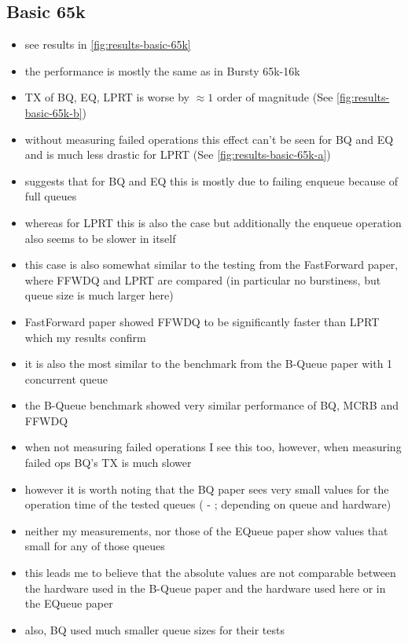 \subsection{Basic 65k}
\begin{itemize}
    \item see results in \autoref{fig:results-basic-65k}
    \item the performance is mostly the same as in Bursty 65k-16k
    \item TX of BQ, EQ, LPRT is worse by $\approx 1$ order of magnitude (See \autoref{fig:results-basic-65k-b})
    \item without measuring failed operations this effect can't be seen for BQ and EQ and is much less
        drastic for LPRT (See \autoref{fig:results-basic-65k-a})
    \item suggests that for BQ and EQ this is mostly due to failing enqueue because of full queues
    \item whereas for LPRT this is also the case but additionally the enqueue operation also seems to be slower in itself
    \item this case is also somewhat similar to the testing from the FastForward paper, where FFWDQ and LPRT are compared (in particular no
        burstiness, but queue size is much larger here)
    \item FastForward paper showed FFWDQ to be significantly faster than LPRT which my results confirm
    \item it is also the most similar to the benchmark from the B-Queue paper with 1 concurrent queue
    \item the B-Queue benchmark showed very similar performance of BQ, MCRB and FFWDQ
    \item when not measuring failed operations I see this too, however, when measuring failed ops BQ's TX is much slower
    \item however it is worth noting that the BQ paper sees very small values for the operation time of the tested queues ( - ; depending on queue and hardware)
    \item neither my measurements, nor those of the EQueue paper show values that small for any of those queues
    \item this leads me to believe that the absolute values are not comparable between the hardware used in the B-Queue paper and the hardware used here or in the EQueue paper
    \item also, BQ used much smaller queue sizes for their tests
\end{itemize}
